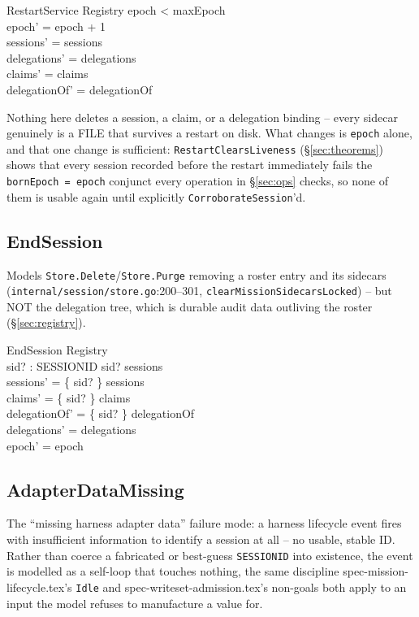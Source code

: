 \documentclass[a4paper,10pt,fleqn]{article}
\newcommand{\fpath}[1]{\texttt{#1}}
\newcommand{\field}[1]{\texttt{#1}}
\begin{document}
\begin{schema}{RestartService}
\Delta Registry
\where
epoch < maxEpoch \\
epoch' = epoch + 1 \\
sessions' = sessions \\
delegations' = delegations \\
claims' = claims \\
delegationOf' = delegationOf
\end{schema}

Nothing here deletes a session, a claim, or a delegation binding --
every sidecar genuinely is a FILE that survives a restart on disk. What
changes is \field{epoch} alone, and that one change is sufficient:
\field{RestartClearsLiveness} (\S\ref{sec:theorems}) shows that every
session recorded before the restart immediately fails the
\field{bornEpoch = epoch} conjunct every operation in \S\ref{sec:ops}
checks, so none of them is usable again until explicitly
\field{CorroborateSession}'d.

\subsection{EndSession}
\label{sec:opendsession}

Models \field{Store.Delete}/\field{Store.Purge} removing a roster entry
and its sidecars (\fpath{internal/session/store.go}:200--301,
\field{clearMissionSidecarsLocked}) -- but NOT the delegation tree,
which is durable audit data outliving the roster (\S\ref{sec:registry}).

\begin{schema}{EndSession}
\Delta Registry \\
sid? : SESSIONID
\where
sid? \in \dom sessions \\
sessions' = \{ sid? \} \ndres sessions \\
claims' = \{ sid? \} \ndres claims \\
delegationOf' = \{ sid? \} \ndres delegationOf \\
delegations' = delegations \\
epoch' = epoch
\end{schema}

\subsection{AdapterDataMissing}
\label{sec:opadaptermissing}

The ``missing harness adapter data'' failure mode: a harness lifecycle
event fires with insufficient information to identify a session at all
-- no usable, stable ID. Rather than coerce a fabricated or
best-guess \field{SESSIONID} into existence, the event is modelled as a
self-loop that touches nothing, the same discipline
spec-mission-lifecycle.tex's \field{Idle} and
spec-writeset-admission.tex's non-goals both apply to an input the
model refuses to manufacture a value for.
\end{document}
